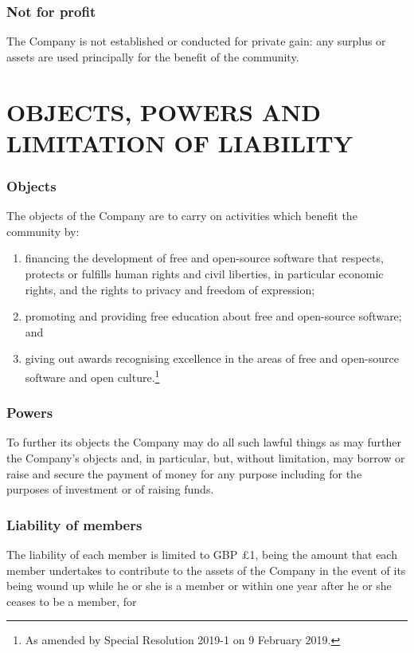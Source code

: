 \documentclass[a4paper,12pt]{article}
\renewcommand{\labelenumi}{\thesection.\arabic{enumi}}
\begin{document}
\section{Not for profit}

The Company is not established or conducted for private gain: any surplus or assets are used principally for the benefit of the community.

\part*{OBJECTS, POWERS AND LIMITATION OF LIABILITY}

\section{Objects}

The objects of the Company are to carry on activities which benefit the community by:

\begin{enumerate}
  \renewcommand{\labelenumi}{(\alph{enumi})}
  \item financing the development of free and open-source software that respects, protects or fulfills human rights and civil liberties, in particular economic rights, and the rights to privacy and freedom of expression;
  \item promoting and providing free education about free and open-source software; and
  \item giving out awards recognising excellence in the areas of free and open-source software and open culture.\footnote{As amended by Special Resolution 2019-1 on 9 February 2019.}
\end{enumerate}

\section{Powers}

To further its objects the Company may do all such lawful things as may further the Company's objects and, in particular, but, without limitation, may borrow or raise and secure the payment of money for any purpose including for the purposes of investment or of raising funds.

\section{Liability of members}

The liability of each member is limited to GBP \pounds1, being the amount that each member undertakes to contribute to the assets of the Company in the event of its being wound up while he or she is a member or within one year after he or she ceases to be a member, for
\end{document}
